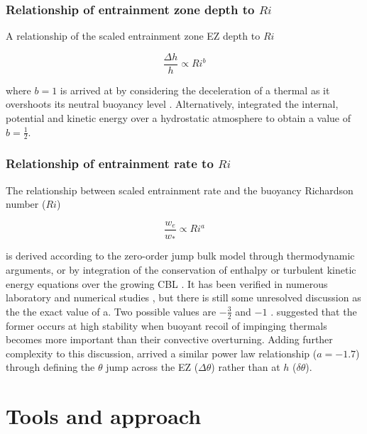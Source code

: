 \subsubsection{Relationship of entrainment zone depth to $Ri$}

A relationship of the scaled entrainment zone EZ depth to $Ri$

\begin{equation}\label{eq:dhvsri}
\frac{\Delta h}{h} \propto Ri ^{b}
\end{equation}

where $b=1$ is arrived at by considering the deceleration of a thermal
as it overshoots its neutral buoyancy level \cite{StullNelEl}.  Alternatively, \cite{Boers89} integrated the internal, potential and kinetic energy over a hydrostatic atmosphere to obtain a value of $b=\frac{1}{2}$.

\subsubsection{Relationship of entrainment rate to $Ri$}
\label{subsec:erri}
The relationship between scaled entrainment rate and the buoyancy Richardson number ($Ri$)

\begin{equation}\label{eq:ervsri}
\frac{w_{e}}{w_{*}} \propto Ri^{a}
\end{equation}

is derived according to the zero-order jump bulk model through thermodynamic arguments, or by integration of the conservation of enthalpy or turbulent kinetic energy equations over the growing CBL \citep{Tennekes73, Deardorff79, FedConzMir04}. It has been verified in numerous laboratory and numerical studies \citep{DearWill80, SullMoengStev, FedConzMir04, BrooksFowler2}, but there is still some unresolved discussion as the the exact value of a.  Two possible values are $-\frac{3}{2}$ and $-1$ \citep{Traum11}.  \cite{Turner86} suggested that the former occurs at high stability when buoyant recoil of impinging thermals becomes more important than their convective overturning.  Adding further complexity to this discussion, \cite{FedConzMir04} arrived a similar power law relationship ($a = -1.7$) through defining the $\theta$ jump across the EZ ($\Delta \theta$) rather than at $h$ ($\delta \theta$).\\

\section{Tools and approach}

